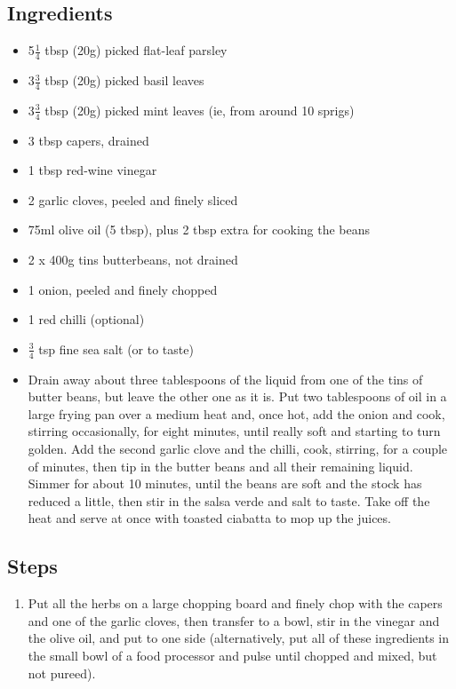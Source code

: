 \documentclass{book}
\begin{document}
\subsection*{Ingredients}
\begin{itemize}
\item 5$\frac{1}{4}$ tbsp (20g) picked flat-leaf parsley
\item 3$\frac{3}{4}$ tbsp (20g) picked basil leaves 
\item 3$\frac{3}{4}$ tbsp (20g) picked mint leaves (ie, from around 10 sprigs)
\item 3 tbsp capers, drained
\item 1 tbsp red-wine vinegar
\item 2 garlic cloves, peeled and finely sliced 
\item 75ml olive oil (5 tbsp), plus 2 tbsp extra for cooking the beans
\item 2 x 400g tins butterbeans, not drained
\item 1 onion, peeled and finely chopped 
\item 1 red chilli (optional) 
\item $\frac{3}{4}$ tsp fine sea salt (or to taste)
\end{itemize}

\begin{itemize}
\item Drain away about three tablespoons of the liquid from one of the tins of butter beans, but leave the other one as it is. Put two tablespoons of oil in a large frying pan over a medium heat and, once hot, add the onion and cook, stirring occasionally, for eight minutes, until really soft and starting to turn golden. Add the second garlic clove and the chilli, cook, stirring, for a couple of minutes, then tip in the butter beans and all their remaining liquid. Simmer for about 10 minutes, until the beans are soft and the stock has reduced a little, then stir in the salsa verde and salt to taste. Take off the heat and serve at once with toasted ciabatta to mop up the juices.
\end{itemize}

\subsection*{Steps}
\begin{enumerate}
\item Put all the herbs on a large chopping board and finely chop with the capers and one of the garlic cloves, then transfer to a bowl, stir in the vinegar and the olive oil, and put to one side (alternatively, put all of these ingredients in the small bowl of a food processor and pulse until chopped and mixed, but not pureed).
\end{enumerate}
\newpage
\end{document}
